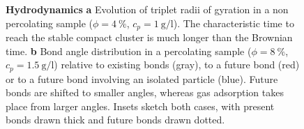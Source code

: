 \begin{figure}
	\caption{\textbf{Hydrodynamics} \textbf{a} Evolution of triplet radii of gyration in a non percolating sample ($\phi=4~\%$, $c_p=\SI{1}{\gram\per\litre}$). The characteristic time to reach the stable compact cluster is much longer than the Brownian time. \textbf{b} Bond angle distribution in a percolating sample ($\phi=8~\%$, $c_p=\SI{1.5}{\gram\per\litre}$) relative to existing bonds (gray), to a future bond (red) or to a future bond involving an isolated particle (blue). Future bonds are shifted to smaller angles, whereas gas adsorption takes place from larger angles. Insets sketch both cases, with present bonds drawn thick and future bonds drawn dotted.}
	\label{fig:hydro}
\end{figure}
\tikzset{external/force remake=false}

